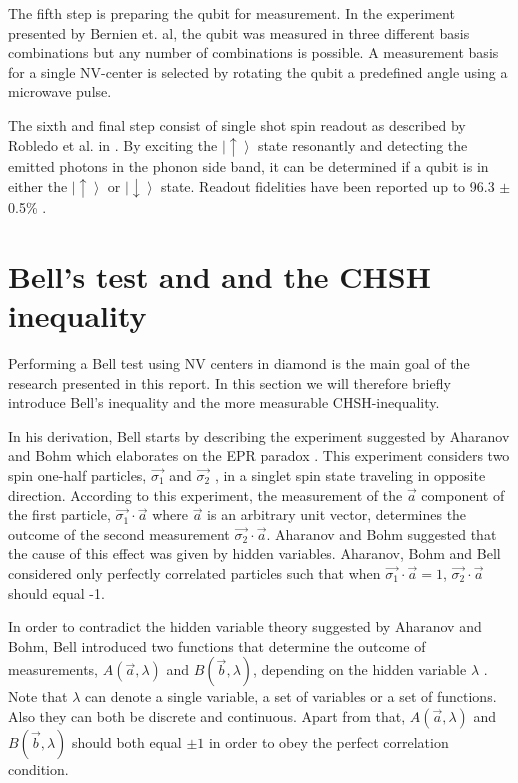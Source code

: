The fifth step is preparing the qubit for measurement. In the experiment presented by Bernien et. al, the qubit was measured in three different basis combinations but any number of combinations is possible. A measurement basis for a single NV-center is selected by rotating the qubit a predefined angle using a microwave pulse. 

The sixth and final step consist of single shot spin readout as described by Robledo et al. in \cite{robledo2011high}. By exciting the  $\left| \uparrow \right>$ state resonantly and detecting the emitted photons in the phonon side band, it can be determined if a qubit is in either the  $\left| \uparrow \right>$ or  $\left| \downarrow \right>$ state. Readout fidelities have been reported up to 96.3  $\pm$ 0.5\% \cite{pfaff2014unconditional}.

\color{tudelft-cyan}
\section{Bell's test and and the CHSH inequality}
\color{black}
\label{BellCHSH}
Performing a Bell test using NV centers in diamond is the main goal of the research presented in this report. In this section we will therefore briefly introduce Bell's inequality  and the more measurable CHSH-inequality. 

In his derivation, Bell starts by describing the experiment suggested by Aharanov and Bohm which elaborates on the EPR paradox \cite{bohm1957discussion}. This experiment considers two spin one-half particles, $\vec{\sigma_1}$ and $\vec{\sigma_2}$ , in a singlet spin state traveling in opposite direction. According to this experiment, the measurement of the $\vec{a}$ component of the first particle, $\vec{\sigma_1} \cdot \vec{a}$ where $\vec{a}$ is an arbitrary unit vector, determines the outcome of the second measurement $\vec{\sigma_2} \cdot \vec{a}$. Aharanov and Bohm suggested that the cause of this effect was given by hidden variables. Aharanov, Bohm and Bell considered only perfectly correlated particles such that when $\vec{\sigma_1} \cdot \vec{a} = 1$, $\vec{\sigma_2} \cdot \vec{a}$ should equal -1. 

In order to contradict the hidden variable theory suggested by Aharanov and Bohm, Bell introduced two functions that determine the outcome of measurements, $A\left( \vec{a}, \lambda \right)$ and $B\left( \vec{b}, \lambda \right)$, depending on the hidden variable $\lambda$ . Note that $\lambda$ can denote a single variable, a set of variables or a set of functions. Also they can both be discrete and continuous. Apart from that,  $A\left( \vec{a}, \lambda \right)$ and $B\left( \vec{b}, \lambda \right)$ should both equal $\pm 1$ in order to obey the perfect correlation condition.

